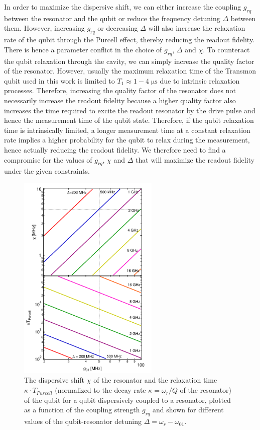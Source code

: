 In order to maximize the dispersive shift, we can either increase the coupling $g_{rq}$ between the resonator and the qubit or reduce the frequency detuning $\Delta$ between them. However, increasing $g_{rq}$ or decreasing $\Delta$ will also increase the relaxation rate of the qubit through the Purcell effect, thereby reducing the readout fidelity. There is hence a parameter conflict in the choice of $g_{rq}$, $\Delta$ and $\chi$. To counteract the qubit relaxation through the cavity, we can simply increase the quality factor of the resonator. However, usually the maximum relaxation time of the Transmon qubit used in this work is limited to $T_1\approx 1-4\;\mathrm{\mu s}$ due to intrinsic relaxation processes. Therefore, increasing the quality factor of the resonator does not necessarily increase the readout fidelity because a higher quality factor also increases the time required to excite the readout resonator by the drive pulse and hence the measurement time of the qubit state. Therefore, if the qubit relaxation time is intrinsically limited, a longer measurement time at a constant relaxation rate implies a higher probability for the qubit to relax during the measurement, hence actually reducing the readout fidelity. We therefore need to find a compromise for the values of $g_{rq}$, $\chi$ and $\Delta$ that will maximize the readout fidelity under the given constraints.

\begin{figure}
	\includegraphics[width=0.6\textwidth]{./material/mathematica/readout_purcell_and_chi_vs_g}
	\caption[]{The dispersive shift $\chi$ of the resonator and the relaxation time $\kappa\cdot T_{Purcell}$ (normalized to the decay rate $\kappa=\omega_r/Q$ of the resonator) of the qubit for a qubit dispersively coupled to a resonator, plotted as a function of the coupling strength $g_{rq}$ and shown for different values of the qubit-resonator detuning $\Delta = \omega_{r}-\omega_{01}$.}
	\label{fig:purcell_rate_and_chi}
\end{figure}


